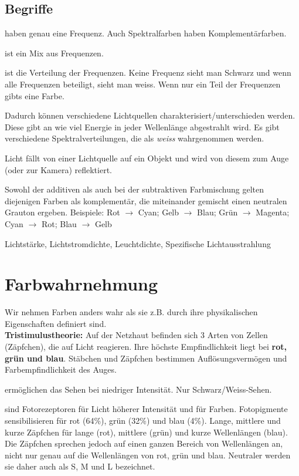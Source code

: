 \subsection{Begriffe}
\begin{description}[labelindent=1cm]
  \item[Spektralfarben] haben genau eine Frequenz. Auch Spektralfarben haben Komplementärfarben.
  \item[Natürliches Licht] ist ein Mix aus Frequenzen.
  \item[Spektrum] ist die Verteilung der Frequenzen. Keine Frequenz sieht man Schwarz und wenn alle Frequenzen beteiligt, sieht man weiss. Wenn nur ein Teil der Frequenzen gibts eine Farbe.
  \item[Spektralverteilung] Dadurch können verschiedene Lichtquellen charakterisiert/unterschieden werden. Diese gibt an wie viel Energie in jeder Wellenlänge abgestrahlt wird. Es gibt verschiedene Spektralverteilungen, die als \textit{weiss} wahrgenommen werden.
  \item[Farbe einer Fläche] Licht fällt von einer Lichtquelle auf ein Objekt und wird von diesem zum Auge (oder zur Kamera) reflektiert.
  \item[Komplementärfarben]  Sowohl der additiven als auch bei der subtraktiven Farbmischung gelten diejenigen Farben als komplementär, die miteinander gemischt einen neutralen Grauton ergeben. Beispiele: Rot \(\to\) Cyan; Gelb \(\to\) Blau; Grün \(\to\) Magenta; Cyan \(\to\) Rot; Blau \(\to\) Gelb
  \item[Weitere Begriffe in der physikalischen Betrachtung] Lichtstärke, Lichtstromdichte, Leuchtdichte, Spezifische Lichtausstrahlung
\end{description}

\section{Farbwahrnehmung}
Wir nehmen Farben anders wahr als sie z.B. durch ihre physikalischen Eigenschaften definiert sind.\\
\textbf{Tristimulustheorie:} Auf der Netzhaut befinden sich 3 Arten von Zellen (Zäpfchen), die auf Licht reagieren. Ihre höchste Empfindlichkeit liegt bei \textbf{rot, grün und blau}. Stäbchen und Zäpfchen bestimmen Auflösungsvermögen und Farbempfindlichkeit des Auges.
\begin{description}[labelindent=1cm]
  \item[Stäbchen $(75-150 \times 10^6)$] ermöglichen das Sehen bei niedriger Intensität. Nur Schwarz/Weiss-Sehen.
  
  \item[Zäpfchen $(6-7 \times 10^6)$] sind Fotorezeptoren für Licht höherer Intensität und für Farben. Fotopigmente sensibilisieren für rot (64\%), grün (32\%) und blau (4\%). Lange, mittlere und kurze Zäpfchen für lange (rot), mittlere (grün) und kurze Wellenlängen (blau). Die Zäpfchen sprechen jedoch auf einen ganzen Bereich von Wellenlängen an, nicht nur genau auf die Wellenlängen von rot, grün und blau. Neutraler werden sie daher auch als S, M und L bezeichnet.
\end{description}

